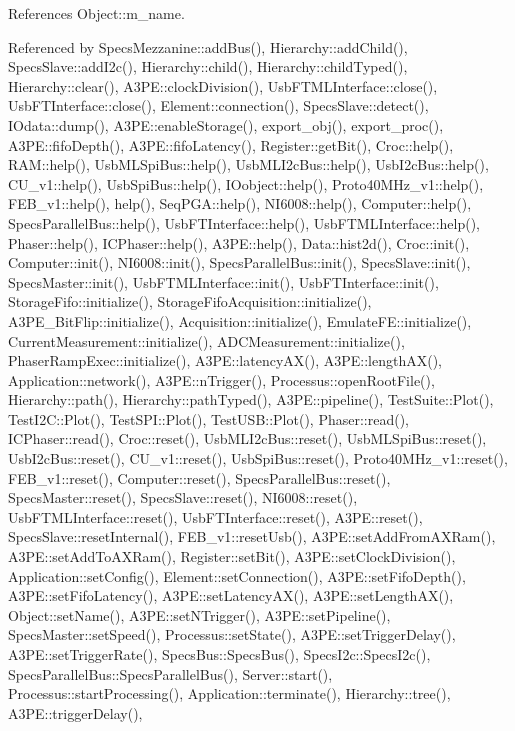 References Object\+::m\+\_\+name.



Referenced by Specs\+Mezzanine\+::add\+Bus(), Hierarchy\+::add\+Child(), Specs\+Slave\+::add\+I2c(), Hierarchy\+::child(), Hierarchy\+::child\+Typed(), Hierarchy\+::clear(), A3\+P\+E\+::clock\+Division(), Usb\+F\+T\+M\+L\+Interface\+::close(), Usb\+F\+T\+Interface\+::close(), Element\+::connection(), Specs\+Slave\+::detect(), I\+Odata\+::dump(), A3\+P\+E\+::enable\+Storage(), export\+\_\+obj(), export\+\_\+proc(), A3\+P\+E\+::fifo\+Depth(), A3\+P\+E\+::fifo\+Latency(), Register\+::get\+Bit(), Croc\+::help(), R\+A\+M\+::help(), Usb\+M\+L\+Spi\+Bus\+::help(), Usb\+M\+L\+I2c\+Bus\+::help(), Usb\+I2c\+Bus\+::help(), C\+U\+\_\+v1\+::help(), Usb\+Spi\+Bus\+::help(), I\+Oobject\+::help(), Proto40\+M\+Hz\+\_\+v1\+::help(), F\+E\+B\+\_\+v1\+::help(), help(), Seq\+P\+G\+A\+::help(), N\+I6008\+::help(), Computer\+::help(), Specs\+Parallel\+Bus\+::help(), Usb\+F\+T\+Interface\+::help(), Usb\+F\+T\+M\+L\+Interface\+::help(), Phaser\+::help(), I\+C\+Phaser\+::help(), A3\+P\+E\+::help(), Data\+::hist2d(), Croc\+::init(), Computer\+::init(), N\+I6008\+::init(), Specs\+Parallel\+Bus\+::init(), Specs\+Slave\+::init(), Specs\+Master\+::init(), Usb\+F\+T\+M\+L\+Interface\+::init(), Usb\+F\+T\+Interface\+::init(), Storage\+Fifo\+::initialize(), Storage\+Fifo\+Acquisition\+::initialize(), A3\+P\+E\+\_\+\+Bit\+Flip\+::initialize(), Acquisition\+::initialize(), Emulate\+F\+E\+::initialize(), Current\+Measurement\+::initialize(), A\+D\+C\+Measurement\+::initialize(), Phaser\+Ramp\+Exec\+::initialize(), A3\+P\+E\+::latency\+A\+X(), A3\+P\+E\+::length\+A\+X(), Application\+::network(), A3\+P\+E\+::n\+Trigger(), Processus\+::open\+Root\+File(), Hierarchy\+::path(), Hierarchy\+::path\+Typed(), A3\+P\+E\+::pipeline(), Test\+Suite\+::\+Plot(), Test\+I2\+C\+::\+Plot(), Test\+S\+P\+I\+::\+Plot(), Test\+U\+S\+B\+::\+Plot(), Phaser\+::read(), I\+C\+Phaser\+::read(), Croc\+::reset(), Usb\+M\+L\+I2c\+Bus\+::reset(), Usb\+M\+L\+Spi\+Bus\+::reset(), Usb\+I2c\+Bus\+::reset(), C\+U\+\_\+v1\+::reset(), Usb\+Spi\+Bus\+::reset(), Proto40\+M\+Hz\+\_\+v1\+::reset(), F\+E\+B\+\_\+v1\+::reset(), Computer\+::reset(), Specs\+Parallel\+Bus\+::reset(), Specs\+Master\+::reset(), Specs\+Slave\+::reset(), N\+I6008\+::reset(), Usb\+F\+T\+M\+L\+Interface\+::reset(), Usb\+F\+T\+Interface\+::reset(), A3\+P\+E\+::reset(), Specs\+Slave\+::reset\+Internal(), F\+E\+B\+\_\+v1\+::reset\+Usb(), A3\+P\+E\+::set\+Add\+From\+A\+X\+Ram(), A3\+P\+E\+::set\+Add\+To\+A\+X\+Ram(), Register\+::set\+Bit(), A3\+P\+E\+::set\+Clock\+Division(), Application\+::set\+Config(), Element\+::set\+Connection(), A3\+P\+E\+::set\+Fifo\+Depth(), A3\+P\+E\+::set\+Fifo\+Latency(), A3\+P\+E\+::set\+Latency\+A\+X(), A3\+P\+E\+::set\+Length\+A\+X(), Object\+::set\+Name(), A3\+P\+E\+::set\+N\+Trigger(), A3\+P\+E\+::set\+Pipeline(), Specs\+Master\+::set\+Speed(), Processus\+::set\+State(), A3\+P\+E\+::set\+Trigger\+Delay(), A3\+P\+E\+::set\+Trigger\+Rate(), Specs\+Bus\+::\+Specs\+Bus(), Specs\+I2c\+::\+Specs\+I2c(), Specs\+Parallel\+Bus\+::\+Specs\+Parallel\+Bus(), Server\+::start(), Processus\+::start\+Processing(), Application\+::terminate(), Hierarchy\+::tree(), A3\+P\+E\+::trigger\+Delay(), 